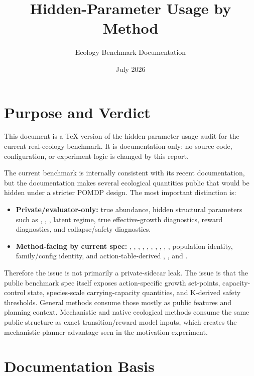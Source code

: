 \documentclass[11pt]{article}
\title{Hidden-Parameter Usage by Method}
\author{Ecology Benchmark Documentation}
\date{July 2026}
\begin{document}
\maketitle

\section{Purpose and Verdict}

This document is a TeX version of the hidden-parameter usage audit for the
current real-ecology benchmark. It is documentation only: no source code,
configuration, or experiment logic is changed by this report.

The current benchmark is internally consistent with its recent documentation, but
the documentation makes several ecological quantities public that would be hidden
under a stricter POMDP design. The most important distinction is:

\begin{itemize}
  \item \textbf{Private/evaluator-only:} true abundance, hidden structural
  parameters such as , , , latent regime,
  true effective-growth diagnostics, reward diagnostics, and collapse/safety
  diagnostics.
  \item \textbf{Method-facing by current spec:} , ,
  , , , ,
  , , , ,
  population identity, family/config identity, and action-table-derived
  , , and .
\end{itemize}

Therefore the issue is not primarily a private-sidecar leak. The issue is that
the public benchmark spec itself exposes action-specific growth set-points,
capacity-control state, species-scale carrying-capacity quantities, and
K-derived safety thresholds. General methods consume those mostly as public
features and planning context. Mechanistic and native ecological methods consume
the same public structure as exact transition/reward model inputs, which creates
the mechanistic-planner advantage seen in the motivation experiment.

\section{Documentation Basis}
\end{document}
